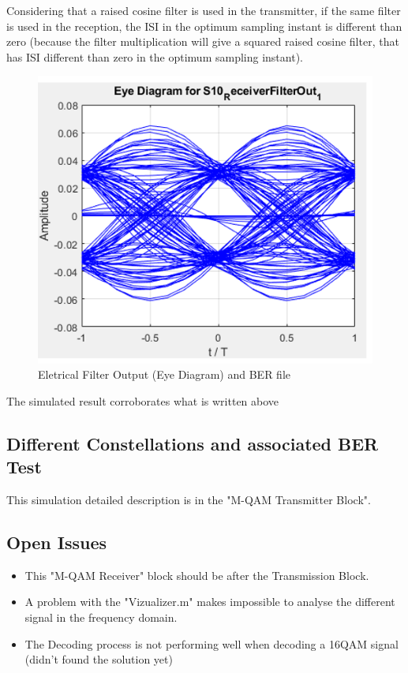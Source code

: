 Considering that a raised cosine filter is used in the transmitter, if the same filter is used in the reception, the ISI in the optimum sampling instant is different than zero (because the filter multiplication will give a squared raised cosine filter, that has ISI different than zero in the optimum sampling instant).
 \begin{figure}[H]
	\centering
	\includegraphics[scale=0.75]{./lib/m_qam_receiver/figures/raisedraised}
	\caption{Eletrical Filter Output (Eye Diagram) and BER file }\label{raised}
\end{figure}
The simulated result corroborates what is written above\\
\subsection*{Different Constellations and associated BER Test}
This simulation detailed description is in the "M-QAM Transmitter Block".

\subsection*{Open Issues}
\begin{itemize}
    \item This "M-QAM Receiver" block should be after the Transmission Block.
    \item A problem with the "Vizualizer.m" makes impossible to analyse the different signal in the frequency domain.
    \item The Decoding process is not performing well when decoding a 16QAM signal (didn't found the solution yet)
\end{itemize}
